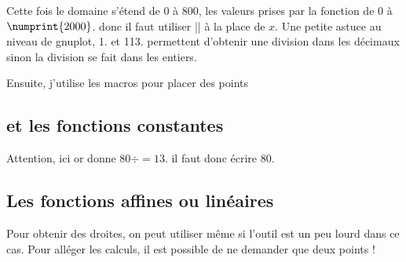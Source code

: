 Cette fois le domaine s'étend de 0 à 800, les valeurs prises par la fonction de $0$ à $\numprint{2000}$.  donc il faut utiliser |\x| à la place de $x$. Une petite astuce au niveau de gnuplot, 1. et 113. permettent d'obtenir une division dans les décimaux sinon la division se fait dans les entiers.

Ensuite, j'utilise les macros pour placer des points
\begin{tkzexample}[vbox]
\end{tkzexample}

\subsection{ et les fonctions constantes}

Attention, ici   or  donne $80\div=13$. il faut donc écrire $80.$

\begin{tkzexample}[vbox]
\end{tkzexample}

\subsection{Les fonctions affines ou linéaires}
Pour obtenir des droites, on peut utiliser  même si l'outil est un peu lourd dans ce cas. Pour alléger les calculs, il est possible de ne demander que deux points !

\begin{tkzexample}[vbox]
\end{tkzexample}
